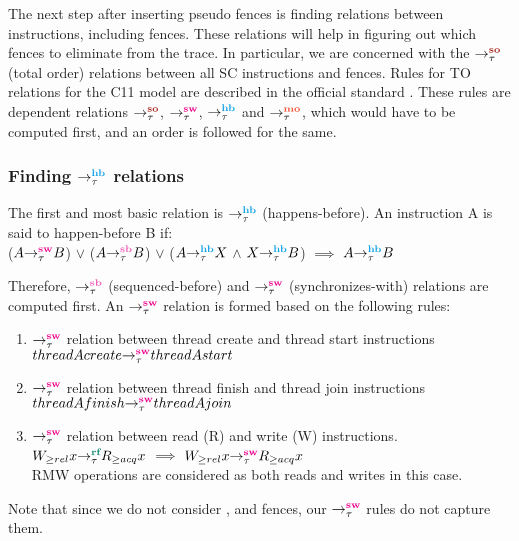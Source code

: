 \par
The next step after inserting pseudo fences is finding relations between 
instructions, including fences. 
These relations will help in figuring out which fences to eliminate from 
the trace. In particular, we are concerned with the $\setSO$ (total order) 
relations between all SC instructions and fences. Rules for TO relations 
for the C11 model are described in the official standard \cite{C11}. 
These rules are dependent relations $\setSO $, $\setSW$, $\setHB$ and $\setMO$, which 
would have to be computed first, and an order is followed for the same.

\subsubsection{Finding $\setHB$ relations}
The first and most basic relation is $\setHB$ (happens-before). 
An instruction A is said to happen-before B if:\\
($\sw{\tau}{A}{B}$) $\lor$ ($\seqb{\tau}{A}{B}$) $\lor$ ($\hb{\tau}{A}{X}$ $\land$ $\hb{\tau}{X}{B}$) $\implies$ $\hb{\tau}{A}{B}$

\par
Therefore, $\setSB$ (sequenced-before) and $\setSW$ (synchronizes-with) 
relations are computed first. 
An $\setSW$ relation is formed based on the following rules:
\begin{enumerate}
\item $\setSW$ relation between thread create and thread start instructions\\
$\sw{\tau}{thread A create}{thread A start}$

\item $\setSW$ relation between thread finish and thread join instructions\\
$\sw{\tau}{thread A finish}{thread A join}$

\item $\setSW$ relation between read (R) and write (W) instructions.\\
$\rf{\tau}{W_{\geq rel}x}{R_{\geq acq}x}$ $\implies$ $\sw{\tau}{W_{\geq rel}x}{R_{\geq acq}x}$\\
RMW operations are considered as both reads and writes in this case.
\end{enumerate}
Note that since we do not consider \moacq, \morel and \moar fences, 
our $\setSW$ rules do not capture them.
\par


%	

